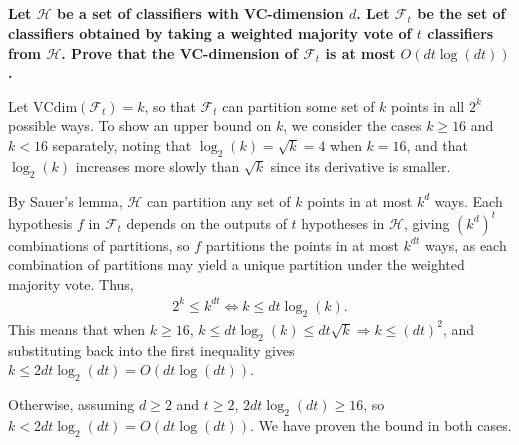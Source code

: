 \documentclass[a4paper,12pt]{article}
\theoremstyle{remark}
\begin{document}
\subsection{}
    \boldmath\textbf{Let $\mathcal{H}$ be a set of classifiers with VC-dimension $d$. Let $\mathcal{F}_t$ be the set of classifiers obtained by taking a weighted majority vote of $t$ classifiers from $\mathcal{H}$. Prove that the VC-dimension of $\mathcal{F}_t$ is at most $O(dt \log(dt))$.
    }\unboldmath \par
    Let $\mathrm{VCdim}(\mathcal{F}_t) = k$, so that $\mathcal{F}_t$ can partition some set of $k$ points in all $2^k$ possible ways. To show an upper bound on $k$, we consider the cases $k \geq 16$ and $k < 16$ separately, noting that $\log_2(k) = \sqrt{k} = 4$ when $k = 16$, and that $\log_2(k)$ increases more slowly than $\sqrt{k}$ since its derivative is smaller. \par
    By Sauer's lemma, $\mathcal{H}$ can partition any set of $k$ points in at most $k^d$ ways. Each hypothesis $f$ in $\mathcal{F}_t$ depends on the outputs of $t$ hypotheses in $\mathcal{H}$, giving $(k^d)^t$ combinations of partitions, so $f$ partitions the points in at most $k^{dt}$ ways, as each combination of partitions may yield a unique partition under the weighted majority vote. Thus,
    \begin{align*}
        2^k \leq k^{dt} \Leftrightarrow k \leq dt\log_2(k).
    \end{align*}
    This means that when $k \geq 16$, $k \leq dt\log_2(k) \leq dt\sqrt{k} \Rightarrow k \leq (dt)^2$, and substituting back into the first inequality gives $k \leq 2dt\log_2(dt) = O(dt\log(dt))$. \par
    Otherwise, assuming $d \geq 2$ and $t \geq 2$, $2dt\log_2(dt) \geq 16$, so $k < 2dt\log_2(dt) = O(dt\log(dt))$. We have proven the bound in both cases.
\end{document}
